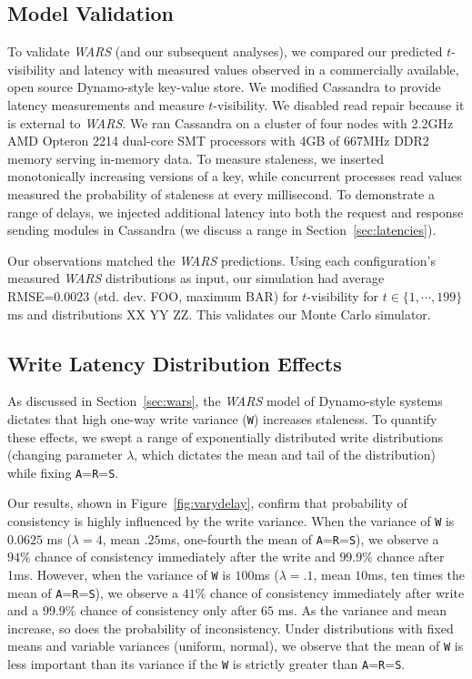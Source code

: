 \documentclass{vldb}
\newcommand{\subsectionskip}{-0em}
\begin{document}
\vspace{\subsectionskip}\subsection{Model Validation}

To validate \textit{WARS} (and our subsequent analyses), we compared
our predicted $t$-visibility and latency with measured values observed
in a commercially available, open source Dynamo-style key-value store.
We modified Cassandra to provide latency measurements and measure
$t$-visibility.  We disabled read repair because it is external to
\textit{WARS}.  We ran Cassandra on a cluster of four nodes with
2.2GHz AMD Opteron 2214 dual-core SMT processors with 4GB of 667MHz
DDR2 memory serving in-memory data.  To measure staleness, we inserted
monotonically increasing versions of a key, while concurrent processes
read values measured the probability of staleness at every
millisecond.  To demonstrate a range of delays, we injected additional
latency into both the request and response sending modules in
Cassandra (we discuss a range in Section~\ref{sec:latencies}).

Our observations matched the \textit{WARS} predictions.  Using each
configuration's measured \textit{WARS} distributions as input, our
simulation had average RMSE=0.0023 (std. dev. FOO, maximum BAR) for
$t$-visibility for $t\in\{1,\cdots,199\}$ ms and distributions XX YY
ZZ.  This validates our Monte Carlo simulator.


\vspace{\subsectionskip}\subsection{Write Latency Distribution Effects}
\label{sec:synthetic}

As discussed in Section~\ref{sec:wars}, the \textit{WARS} model of
Dynamo-style systems dictates that high one-way write variance
(\texttt{W}) increases staleness.  To quantify these effects, we swept
a range of exponentially distributed write distributions (changing
parameter $\lambda$, which dictates the mean and tail of the
distribution) while fixing \texttt{A}=\texttt{R}=\texttt{S}.

Our results, shown in Figure~\ref{fig:varydelay}, confirm that
probability of consistency is highly influenced by the write variance.
When the variance of \texttt{W} is $0.0625$ ms ($\lambda=4$, mean
$.25$ms, one-fourth the mean of \texttt{A}=\texttt{R}=\texttt{S}), we
observe a $94\%$ chance of consistency immediately after the write and
$99.9\%$ chance after 1ms.  However, when the variance of \texttt{W}
is $100$ms ($\lambda=.1$, mean $10$ms, ten times the mean of
\texttt{A}=\texttt{R}=\texttt{S}), we observe a $41\%$ chance of
consistency immediately after write and a $99.9\%$ chance of
consistency only after $65$ ms.  As the variance and mean increase, so
does the probability of inconsistency.  Under distributions with fixed
means and variable variances (uniform, normal), we observe that the
mean of \texttt{W} is less important than its variance if the
\texttt{W} is strictly greater than \texttt{A}=\texttt{R}=\texttt{S}.
\end{document}
